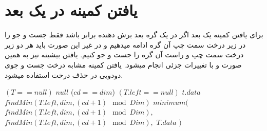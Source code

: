 \documentclass[11pt]{article}
\begin{document}
\section{یافتن کمینه در یک بعد}
برای یافتن کمینه یک بعد 
اگر در یک گره بعد برش دهنده برابر 
باشد فقط جست و جو را در زیر درخت سمت چپ آن گره ادامه میدهیم و در غیر این صورت باید هر دو زیر درخت سمت چپ و راست آن گره را جست و جو کنیم.
یافتن بیشینه نیز به همین صورت و با تغییرات جزئی انجام میشود. 
یافتن کمینه مشابه درخت جست و جوی دودویی در حذف درخت استفاده میشود. 
\begin{latin}
\begin{codebox}
\li \If $(T == null)$ 
\li \Do \Return $null$
\End
\li \If ($cd == dim$)
\li \Do \If $(T.left == null)$ \Return $t.data$
\li \Do \Else \Return $findMin(T.left, dim, (cd+1) \mod Dim)$
\End
\li \Else
\li  \Return $minimum($
\li \Do $findMin(T.left, dim, (cd+1) \mod Dim),$
\li  $findMin(T.left, dim, (cd+1) \mod Dim),$
\li  $T.data$
\li $)$
\End
\end{codebox}
\end{latin}
\end{document}

